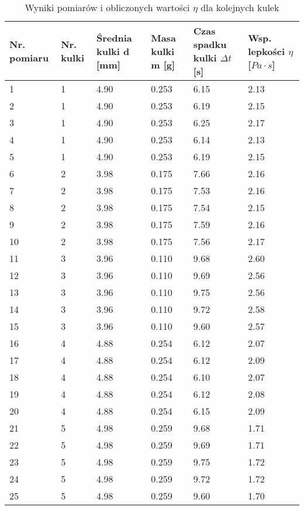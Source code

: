 \documentclass[a4paper,12pt]{article}
\begin{document}
\begin{justify}
\begin{table}[H]
\begin{center}
\begin{scriptsize}
\begin{tabular}{|l|l|l|l|l|l|}
\hline
Nr. pomiaru &  Nr. kulki & Średnia kulki d [mm] & Masa kulki m [g] & Czas spadku kulki $\Delta t$ [s] & Wsp. lepkości $\eta$ [$Pa \cdot s$] \\
\hline
1 & 1 & 4.90 & 0.253  & 6.15 & 2.13 \\
2 & 1 & 4.90 & 0.253 & 6.19 & 2.15 \\
3 & 1 & 4.90 & 0.253 & 6.25  & 2.17 \\
4 & 1 & 4.90 & 0.253 & 6.14 & 2.13 \\
5 & 1 & 4.90 & 0.253 & 6.19 & 2.15 \\
\hline
6 & 2 & 3.98 & 0.175 & 7.66 & 2.16 \\
7 & 2 & 3.98 & 0.175 & 7.53 & 2.16 \\
8 & 2 & 3.98 & 0.175 & 7.54 & 2.15\\
9 & 2 & 3.98 & 0.175 & 7.59 & 2.16 \\
10 & 2 & 3.98 & 0.175 & 7.56 & 2.17 \\
\hline
11 & 3 & 3.96 & 0.110 & 9.68  & 2.60 \\
12 & 3 & 3.96 & 0.110 & 9.69 & 2.56\\
13 & 3 & 3.96 & 0.110 & 9.75 & 2.56\\
14 & 3 & 3.96 & 0.110 & 9.72 & 2.58 \\
15 & 3 & 3.96 & 0.110 & 9.60 & 2.57 \\
\hline
16 & 4 & 4.88 & 0.254 & 6.12 & 2.07 \\
17 & 4 & 4.88 & 0.254 & 6.12 & 2.09 \\
18 & 4 & 4.88 & 0.254 & 6.10 & 2.07 \\
19 & 4 & 4.88 & 0.254 & 6.12 & 2.08\\
20 & 4 & 4.88 & 0.254 & 6.15 & 2.09 \\
\hline
21 & 5 & 4.98 & 0.259 & 9.68 & 1.71 \\
22 & 5 & 4.98 & 0.259 & 9.69 & 1.71 \\
23 & 5 & 4.98 & 0.259 & 9.75 & 1.72 \\
24 & 5 & 4.98 & 0.259 & 9.72 & 1.72 \\
25 & 5 & 4.98 & 0.259 & 9.60 & 1.70 \\
\hline
\end{tabular}
\caption{Wyniki pomiarów i obliczonych wartości $\eta$ dla kolejnych kulek }
\label{table:1}
\end{scriptsize}
\end{center}
\end{table}


\end{justify}
\end{document}
